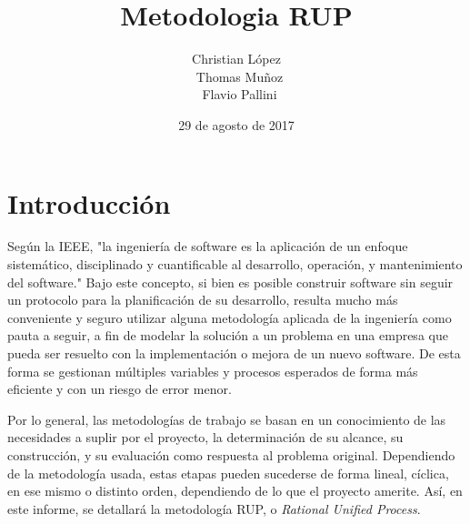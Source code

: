 \documentclass[spanish]{udpreport}
\title{Metodologia RUP}
\author{Christian López \\ Thomas Muñoz \\ Flavio Pallini}
\date{29 de agosto de 2017}
\begin{document}
\maketitle

\tableofcontents
\listoffigures

\chapter{Introducción}
Según la IEEE, "la ingeniería de software es la aplicación de un enfoque sistemático, disciplinado y cuantificable al desarrollo, operación, y mantenimiento del software." Bajo este concepto, si bien es posible construir software sin seguir un protocolo para la planificación de su desarrollo, resulta mucho más conveniente y seguro utilizar alguna metodología aplicada de la ingeniería como pauta a seguir, a fin de modelar la solución a un problema en una empresa que pueda ser resuelto con la implementación o mejora de un nuevo software. De esta forma se gestionan múltiples variables y procesos esperados de forma más eficiente y con un riesgo de error menor. \par
Por lo general, las metodologías de trabajo se basan en un conocimiento de las necesidades a suplir por el proyecto, la determinación de su alcance, su construcción, y su evaluación como respuesta al problema original. Dependiendo de la metodología usada, estas etapas pueden sucederse de forma lineal, cíclica, en ese mismo o distinto orden, dependiendo de lo que el proyecto amerite. Así, en este informe, se detallará la metodología RUP, o \textit{Rational Unified Process}.
\end{document}
